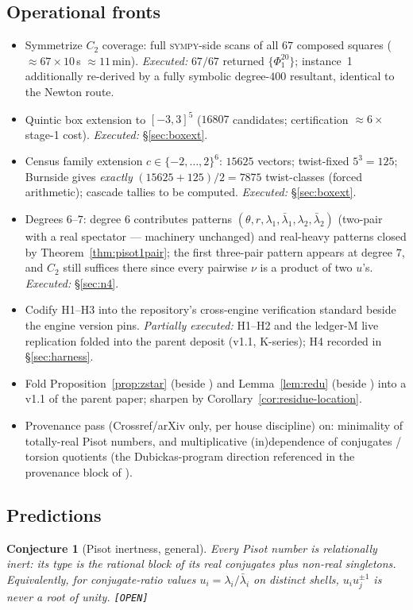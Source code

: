 \documentclass[11pt]{article}
\newcommand{\Op}{\textnormal{\texttt{[OPEN]}}}
\newcommand{\sy}{\textsc{sympy}}
\newtheorem{conjecture}[theorem]{Conjecture}
\theoremstyle{definition}
\begin{document}
\subsection{Operational fronts}
\begin{itemize}
\item[\textbf{N1.}] Symmetrize $C_2$ coverage: full \sy-side scans of all $67$
composed squares ($\approx67\times10$\,s $\approx11$\,min). \emph{Executed:}
$67/67$ returned $\{\Phi_1^{20}\}$; instance~1 additionally re-derived by a
fully symbolic degree-$400$ resultant, identical to the Newton route.
\item[\textbf{N2.}] Quintic box extension to $[-3,3]^5$ ($16807$ candidates;
certification $\approx6\times$ stage-1 cost). \emph{Executed:}
\S\ref{sec:boxext}.
\item[\textbf{N3.}] Census family extension $c\in\{-2,\dots,2\}^6$: $15625$
vectors; twist-fixed $5^3=125$; Burnside gives \emph{exactly}
$(15625+125)/2=7875$ twist-classes (forced arithmetic); cascade tallies to be
computed. \emph{Executed:} \S\ref{sec:boxext}.
\item[\textbf{N4.}] Degrees $6$--$7$: degree $6$ contributes patterns
$(\theta,r,\lambda_1,\bar\lambda_1,\lambda_2,\bar\lambda_2)$ (two-pair with a
real spectator --- machinery unchanged) and real-heavy patterns closed by
Theorem~\ref{thm:pisot1pair}; the first three-pair pattern appears at degree
$7$, and $C_2$ still suffices there since every pairwise $\nu$ is a product of
two $u$'s. \emph{Executed:} \S\ref{sec:n4}.
\item[\textbf{N5.}] Codify H1--H3 into the repository's cross-engine
verification standard beside the engine version pins. \emph{Partially
executed:} H1--H2 and the ledger-M live replication folded into the parent
deposit (v1.1, K-series); H4 recorded in \S\ref{sec:harness}.
\item[\textbf{N6.}] Fold Proposition~\ref{prop:zstar} (beside
\cite[Ex.~7.19]{relcharge}) and Lemma~\ref{lem:redu} (beside
\cite[Rem.~7.6]{relcharge}) into a v1.1 of the parent paper; sharpen
\cite[Cor.~7.16]{relcharge} by Corollary~\ref{cor:residue-location}.
\item[\textbf{N7.}] Provenance pass (Crossref/arXiv only, per house discipline)
on: minimality of totally-real Pisot numbers, and multiplicative
(in)dependence of conjugates / torsion quotients (the Dubickas-program
direction referenced in the provenance block of \cite{relcharge}).
\end{itemize}

\subsection{Predictions}
\begin{conjecture}[Pisot inertness, general]\label{conj:pisot}
Every Pisot number is relationally inert: its type is the rational block of its
real conjugates plus non-real singletons. Equivalently, for conjugate-ratio
values $u_i=\lambda_i/\bar\lambda_i$ on distinct shells, $u_iu_j^{\pm1}$ is
never a root of unity. \Op
\end{conjecture}
\end{document}
